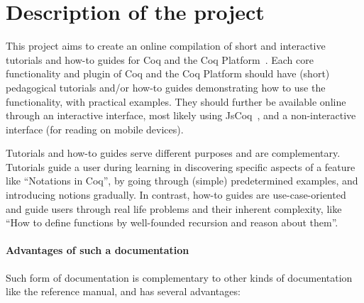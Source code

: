 \documentclass{easychair}
\begin{document}
\section{Description of the project}

This project aims to create an online compilation of short and interactive
tutorials and how-to guides for Coq and the Coq Platform~\cite{Link_Coq_Platform,palmskog2022reliably}.
Each core functionality and plugin of Coq and the Coq Platform should have
(short) pedagogical tutorials and/or how-to guides demonstrating how to use the
functionality, with practical examples. They should further be available online
through an interactive interface, most likely using JsCoq~\cite{jscoq},
and a non-interactive interface (for reading on mobile devices).

Tutorials and how-to guides serve different purposes and are complementary.
Tutorials guide a user during learning in discovering specific aspects of a
feature like ``Notations in Coq'', by going through (simple) predetermined
examples, and introducing notions gradually. In contrast, how-to guides are
use-case-oriented and guide users through real life problems and their inherent
complexity, like ``How to define functions by well-founded recursion and reason
about them''.

\paragraph{Advantages of such a documentation}

Such form of documentation is complementary to other kinds of documentation like
the reference manual, and has several advantages:
\end{document}
